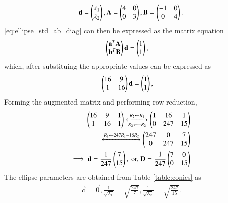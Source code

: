 \begin{enumerate}[label=\thesection.\arabic*.,ref=\thesection.\theenumi]
\begin{align}
\mathbf{d} = \begin{pmatrix}\lambda_1\\ \lambda_2\end{pmatrix},
\mathbf{A} = \begin{pmatrix}4 & 0 \\ 0 & 3\end{pmatrix},
\mathbf{B} = \begin{pmatrix}-1 & 0 \\ 0 & 4\end{pmatrix}.
\end{align}
\eqref{eq:ellipse_std_ab_diag}
can then be expressed as the matrix equation
\begin{align}
\label{eq:ellipse_std_ab_diag_mateq}
\begin{pmatrix}\mathbf{a}^T\mathbf{A}\\ \mathbf{b}^T\mathbf{B}\end{pmatrix}\mathbf{d} &= \begin{pmatrix}1\\1\end{pmatrix},
\end{align}
which, after substituing the appropriate values can be expressed as
\begin{align}
\label{eq:ellipse_std_ab_diag_mateq_subs}
\begin{pmatrix}16 & 9\\ 1 & 16\end{pmatrix}\mathbf{d} &= \begin{pmatrix}1\\1\end{pmatrix},
\end{align}
Forming the augmented matrix and performing row reduction,
\begin{align}
\begin{pmatrix}16 & 9 & 1\\ 1 & 16 & 1\end{pmatrix} 
\xleftrightarrow[R_2\leftarrow -R_2]{R_2\leftarrow R_1}
\begin{pmatrix}1 & 16 & 1 \\ 0 & 247 & 15\end{pmatrix} 
\\
\xleftrightarrow[]{R_1\leftarrow 247R_1-16R_2}
\begin{pmatrix}247 & 0 & 7 \\ 0 & 247 & 15\end{pmatrix} 
\\
\implies \mathbf{d} = \frac{1}{247}\begin{pmatrix}7\\15\end{pmatrix}, \text{ or, } \mathbf{D} = \frac{1}{247}\begin{pmatrix}7 & 0 \\ 0 & 15\end{pmatrix}
\end{align}
The ellipse parameters are obtained from Table \ref{table:conics} as
\begin{align}
\vec{c} = \vec{0},
\frac{1}{\sqrt{\lambda_1}}  = \sqrt{\frac{247}{7}},
\frac{1}{\sqrt{\lambda_2}}  = \sqrt{\frac{247}{15}}.
\end{align}


\end{enumerate}
